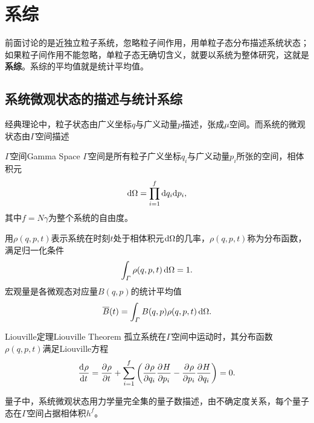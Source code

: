 \newcommand*{\Cr}{\mathrm C}
\newcommand*{\rs}{\mathrm r}
\newcommand*{\st}{\mathrm s}

\chapter{系综}

前面讨论的是近独立粒子系统，忽略粒子间作用，用单粒子态分布描述系统状态；如果粒子间作用不能忽略，单粒子态无确切含义，就要以系统为整体研究，这就是\textbf{系综}。系综的平均值就是统计平均值。

\section{系统微观状态的描述与统计系综}

经典理论中，粒子状态由广义坐标$q$与广义动量$p$描述，张成$\mu$空间。而系统的微观状态由$\varGamma$空间描述
\begin{definition}{$\varGamma$空间}{Gamma Space}
	$\varGamma$空间是所有粒子广义坐标$q_i$与广义动量$p_i$所张的空间，相体积元
	\begin{align}
		\mathop{}\!\mathrm{d}\Omega=\prod_{i=1}^f\mathop{}\!\mathrm{d} q_i\mathrm{d} p_i,
	\end{align}
	其中$f=N\gamma$为整个系统的自由度。
\end{definition}

用$\rho(q,p,t)$表示系统在时刻$t$处于相体积元$\mathop{}\!\mathrm{d}\Omega$的几率，$\rho(q,p,t)$称为分布函数，满足归一化条件
\[
	\int_\varGamma\rho(q,p,t)\mathop{}\!\mathrm{d}\Omega=1.
\]
宏观量是各微观态对应量$B(q,p)$的统计平均值
\begin{equation}
	\overline{B}(t)=\int_\varGamma B(q,p)\rho(q,p,t)\mathop{}\!\mathrm{d}\Omega.
\end{equation}

\begin{theorem}
	{Liouville定理}{Liouville Theorem}
	孤立系统在$\varGamma$空间中运动时，其分布函数$\rho(q,p,t)$满足Liouville方程
	\begin{equation}
		\frac{\mathrm{d}^{{}}\rho}{\mathrm{d}{t}^{{}}}=\frac{\partial^{{}}\rho}{\partial{t}^{{}}}+\sum_{i=1}^f\left(\frac{\partial^{{}}\rho}{\partial{q_i}^{{}}}\frac{\partial^{{}}H}{\partial{p_i}^{{}}}-\frac{\partial^{{}}\rho}{\partial{p_i}^{{}}}\frac{\partial^{{}}H}{\partial{q_i}^{{}}}\right)=0.
	\end{equation}
\end{theorem}


量子中，系统微观状态用力学量完全集的量子数描述，由不确定度关系，每个量子态在$\varGamma$空间占据相体积$h^f$。

